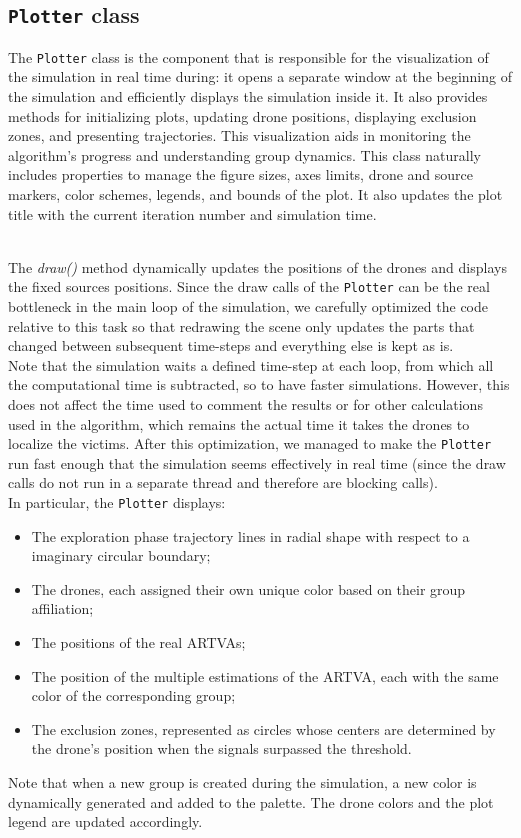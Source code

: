 \subsection{\texttt{Plotter} class}
The \texttt{Plotter} class is the component that is responsible 
for the visualization of the simulation in real time during: 
it opens a separate window at the beginning
of the simulation and efficiently displays the simulation inside it.
It also provides methods for initializing plots, updating drone positions, 
displaying exclusion zones, and presenting trajectories. 
This visualization aids in monitoring the algorithm's 
progress and understanding group dynamics.
This class naturally includes properties to manage 
the figure sizes, axes limits, drone and source markers, color schemes, 
legends, and bounds of the plot.
It also updates the plot title with the current iteration 
number and simulation time.

\noindent\\
The \textit{draw()} method dynamically updates the positions of the 
drones and displays the fixed sources positions.
Since the draw calls of the \texttt{Plotter} can be the real bottleneck in the 
main loop of the simulation, we carefully optimized the code relative 
to this task so that redrawing the scene only updates the parts that 
changed between subsequent time-steps and everything else is kept as is.\\
Note that the simulation waits a defined time-step at each loop, 
from which all the computational time is subtracted, so to have faster simulations. 
However, this does not affect the time used to comment the results or for other 
calculations used in the algorithm, which remains the actual time it takes the 
drones to localize the victims. After this optimization, 
we managed to make the \texttt{Plotter} run fast 
enough that the simulation seems effectively in real time (since 
the draw calls do not run in a separate thread and therefore are blocking calls).\\

\noindent
In particular, the \texttt{Plotter} displays:
\begin{itemize}
    \item The exploration phase trajectory lines in radial shape with respect to 
    a imaginary circular boundary; 
    \item The drones, each assigned their own unique color based on their group affiliation;
    \item The positions of the real ARTVAs; 
    \item The position of the multiple estimations of the ARTVA, each with 
    the same color of the corresponding group;
    \item The exclusion zones, represented as circles whose centers are determined
    by the drone's position when the signals surpassed the threshold. 
\end{itemize}
Note that when a new group is created during 
the simulation, a new color is dynamically generated and added 
to the palette. The drone colors and the plot legend are updated 
accordingly.

